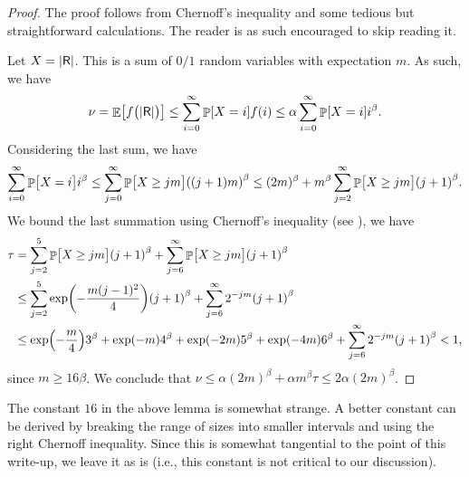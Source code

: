 \begin{proof}
    The proof follows from Chernoff's inequality and some tedious but
    straightforward calculations. The reader is as such encouraged to
    skip reading it.

    Let $X = \left| {\mathsf{R}} \right|$. This is a sum of $0/1$ random variables with
    expectation $m$. As such, we have
    \begin{equation*}
        \nu%
        =%
        \Ex{\bigl. \cFuncX{\bigl.\cardin{\Sample}} }%
        \leq %
        \sum_{i=0}^\infty \Prob{X = i} f(i)
        \leq%
        \alpha 
        \sum_{i=0}^\infty \Prob{X = i} 
        i^\beta.        
    \end{equation*}
    Considering the last sum, we have
    \begin{equation*}
        \sum_{i=0}^\infty \Prob{\big. X = i} i^\beta
        \leq %
        \sum_{j=0}^\infty \Prob{\big. X \geq  j  m } \pth{(j+1) m}^\beta%
        \leq %
        (2m)^\beta  
        + m^\beta \sum_{j=2}^\infty \Prob{\big. X \geq  j  m }
        \pth{j+1 }^\beta.%
    \end{equation*}
    We bound the last summation using Chernoff's inequality (see
    ), we have
    \begin{align*}
      \tau%
      &= %
        \sum_{j=2}^5 \Prob{\big. X \geq  j  m }
        \pth{j+1 }^\beta
        + 
        \sum_{j=6}^\infty \Prob{\big. X \geq  j  m }
        \pth{j+1 }^\beta
      \\&%
      \leq      
      \sum_{j=2}^5 \exp \pth{ - \frac{m (j-1)^2}{4} }
      \pth{j+1 }^\beta
      + 
      \sum_{j=6}^\infty 2^{-jm}
      \pth{j+1 }^\beta %
      \\&%
      \leq%
      \exp\pth{ - \frac{m}{4} } 3^\beta
      + \exp\pth{ - m} 4^\beta 
      + \exp\pth{ - 2m} 5^\beta 
      + \exp\pth{ - 4m} 6^\beta 
      + \sum_{j=6}^\infty 2^{-jm}
      \pth{j+1 }^\beta %
      < 1,
    \end{align*}
    since $m \geq 16 \beta$. We conclude that
    $\nu \leq \alpha (2 m)^\beta + \alpha m^\beta \tau \leq 2
    \alpha(2m)^\beta$.
\end{proof}

\begin{remark}
    The constant $16$ in the above lemma is somewhat strange. A better
    constant can be derived by breaking the range of sizes into
    smaller intervals and using the right Chernoff inequality. Since
    this is somewhat tangential to the point of this write-up, we
    leave it as is (i.e., this constant is not critical to our
    discussion).
\end{remark}



